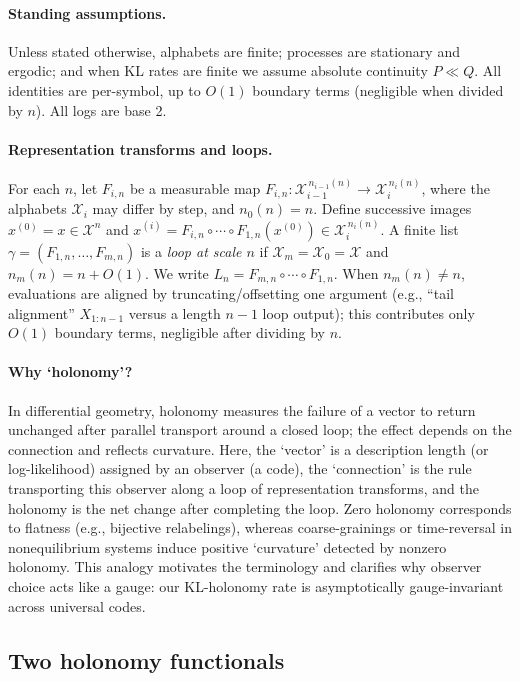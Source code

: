\documentclass[11pt]{article}
\newcommand{\X}{\mathcal{X}}
\newcommand{\1}{\mathbbm{1}}
\begin{document}
\paragraph{Standing assumptions.}
Unless stated otherwise, alphabets are finite; processes are stationary and ergodic;
and when KL rates are finite we assume absolute continuity $P\ll Q$.
All identities are per-symbol, up to $O(1)$ boundary terms (negligible when divided by $n$).
All logs are base 2.

\paragraph{Representation transforms and loops.}
For each $n$, let $F_{i,n}$ be a measurable map
$F_{i,n}:\X_{i-1}^{\,n_{i-1}(n)}\to\X_i^{\,n_i(n)}$, where the alphabets
$\X_i$ may differ by step, and $n_0(n)=n$. Define successive images
$x^{(0)}=x\in\X^n$ and $x^{(i)} = F_{i,n}\circ\cdots\circ F_{1,n}(x^{(0)}) \in \X_i^{\,n_i(n)}$.
A finite list $\gamma=(F_{1,n},\ldots,F_{m,n})$ is a \emph{loop at scale $n$}
if $\X_m=\X_0=\X$ and $n_m(n)=n+O(1)$. We write $L_n=F_{m,n}\circ\cdots\circ F_{1,n}$.
When $n_m(n)\neq n$, evaluations are aligned by truncating/offsetting one argument
(e.g., ``tail alignment'' $X_{1:n-1}$ versus a length $n\!-\!1$ loop output);
this contributes only $O(1)$ boundary terms, negligible after dividing by $n$.

\paragraph{Why `holonomy'?}
In differential geometry, holonomy measures the failure of a vector to return unchanged after
parallel transport around a closed loop; the effect depends on the connection and reflects curvature.
Here, the `vector' is a description length (or log-likelihood) assigned by an observer (a code),
the `connection' is the rule transporting this observer along a loop of representation transforms,
and the holonomy is the net change after completing the loop.
Zero holonomy corresponds to flatness (e.g., bijective relabelings), whereas coarse-grainings or
time-reversal in nonequilibrium systems induce positive `curvature' detected by nonzero holonomy.
This analogy motivates the terminology and clarifies why observer choice acts like a gauge: our
KL-holonomy rate is asymptotically gauge-invariant across universal codes.

\subsection{Two holonomy functionals}
\end{document}
